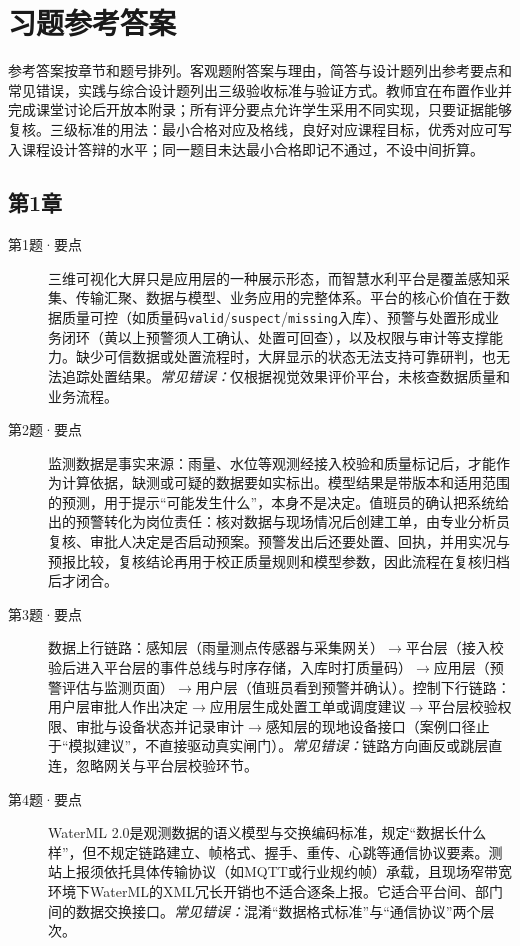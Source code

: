 \chapter{习题参考答案}
\label{app:answers}

参考答案按章节和题号排列。客观题附答案与理由，简答与设计题列出参考要点和常见错误，实践与综合设计题列出三级验收标准与验证方式。教师宜在布置作业并完成课堂讨论后开放本附录；所有评分要点允许学生采用不同实现，只要证据能够复核。三级标准的用法：最小合格对应及格线，良好对应课程目标，优秀对应可写入课程设计答辩的水平；同一题目未达最小合格即记不通过，不设中间折算。


\section{第1章}
\begin{description}
\item[第1题·要点] 三维可视化大屏只是应用层的一种展示形态，而智慧水利平台是覆盖感知采集、传输汇聚、数据与模型、业务应用的完整体系。平台的核心价值在于数据质量可控（如质量码\texttt{valid}/\texttt{suspect}/\texttt{missing}入库）、预警与处置形成业务闭环（黄以上预警须人工确认、处置可回查），以及权限与审计等支撑能力。缺少可信数据或处置流程时，大屏显示的状态无法支持可靠研判，也无法追踪处置结果。\textit{常见错误：}仅根据视觉效果评价平台，未核查数据质量和业务流程。
\item[第2题·要点] 监测数据是事实来源：雨量、水位等观测经接入校验和质量标记后，才能作为计算依据，缺测或可疑的数据要如实标出。模型结果是带版本和适用范围的预测，用于提示“可能发生什么”，本身不是决定。值班员的确认把系统给出的预警转化为岗位责任：核对数据与现场情况后创建工单，由专业分析员复核、审批人决定是否启动预案。预警发出后还要处置、回执，并用实况与预报比较，复核结论再用于校正质量规则和模型参数，因此流程在复核归档后才闭合。
\item[第3题·要点] 数据上行链路：感知层（雨量测点传感器与采集网关）$\rightarrow$平台层（接入校验后进入平台层的事件总线与时序存储，入库时打质量码）$\rightarrow$应用层（预警评估与监测页面）$\rightarrow$用户层（值班员看到预警并确认）。控制下行链路：用户层审批人作出决定$\rightarrow$应用层生成处置工单或调度建议$\rightarrow$平台层校验权限、审批与设备状态并记录审计$\rightarrow$感知层的现地设备接口（案例口径止于“模拟建议”，不直接驱动真实闸门）。\textit{常见错误：}链路方向画反或跳层直连，忽略网关与平台层校验环节。
\item[第4题·要点] WaterML 2.0是观测数据的语义模型与交换编码标准，规定“数据长什么样”，但不规定链路建立、帧格式、握手、重传、心跳等通信协议要素。测站上报须依托具体传输协议（如MQTT或行业规约帧）承载，且现场窄带宽环境下WaterML的XML冗长开销也不适合逐条上报。它适合平台间、部门间的数据交换接口。\textit{常见错误：}混淆“数据格式标准”与“通信协议”两个层次。

\end{description}
